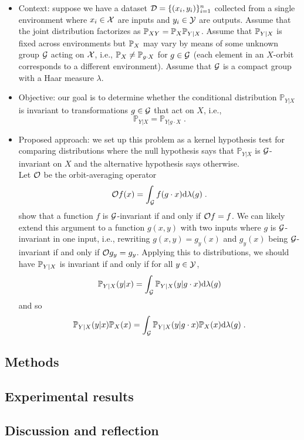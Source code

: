 \begin{itemize}

\item
Context: suppose we have a dataset $\mathcal{D}=\{(x_i,y_i)\}_{i=1}^n$ collected from a single environment where $x_i\in\mathcal{X}$ are inputs and $y_i\in\mathcal{Y}$ are outputs. Assume that the joint distribution factorizes as $\mathbb{P}_{XY}=\mathbb{P}_X\mathbb{P}_{Y|X}$. Assume that $\mathbb{P}_{Y|X}$ is fixed across environments but $\mathbb{P}_X$ may vary by means of some unknown group $\mathcal{G}$ acting on $\mathcal{X}$, i.e., $\mathbb{P}_X\neq\mathbb{P}_{g\cdot X}$ for $g\in\mathcal{G}$ (each element in an $X$-orbit corresponds to a different environment). Assume that $\mathcal{G}$ is a compact group with a Haar measure $\lambda$.

\item
Objective: our goal is to determine whether the conditional distribution $\mathbb{P}_{Y|X}$ is invariant to transformations $g\in\mathcal{G}$ that act on $X$, i.e.,
\[
\mathbb{P}_{Y|X}=\mathbb{P}_{Y|g\cdot X}\;.
\]

\item
Proposed approach: we set up this problem as a kernel hypothesis test for comparing distributions where the null hypothesis says that $\mathbb{P}_{Y|X}$ is $\mathcal{G}$-invariant on $X$ and the alternative hypothesis says otherwise.
\\

Let $\mathcal{O}$ be the orbit-averaging operator \parencite{Elesedy:2021}
\[
\mathcal{O} f(x) = \int_{\mathcal{G}} f(g\cdot x)\mathrm{d}\lambda(g)\;.
\]
\parencite{Elesedy:2021,Elesedy:2021:equivariant} show that a function $f$ is $\mathcal{G}$-invariant if and only if $\mathcal{O} f=f$. We can likely extend this argument to a function $g(x,y)$ with two inputs where $g$ is $\mathcal{G}$-invariant in one input, i.e., rewriting $g(x,y)=g_y(x)$ and $g_y(x)$ being $\mathcal{G}$-invariant if and only if $\mathcal{O} g_y = g_y$. Applying this to distributions, we should have $\mathbb{P}_{Y|X}$ is invariant if and only if for all $y\in\mathcal{Y}$,
\[
\mathbb{P}_{Y|X}(y|x)=\int_{\mathcal{G}}\mathbb{P}_{Y|X}(y|g\cdot x)\mathrm{d}\lambda(g)
\]
and so
\[
\mathbb{P}_{Y|X}(y|x)\mathbb{P}_X(x)=\int_{\mathcal{G}}\mathbb{P}_{Y|X}(y|g\cdot x)\mathbb{P}_X(x)\mathrm{d}\lambda(g) \;.
\]

\end{itemize}
\fi


\subsection{\todo Methods}

\subsection{\todo Experimental results}

\subsection{Discussion and reflection}